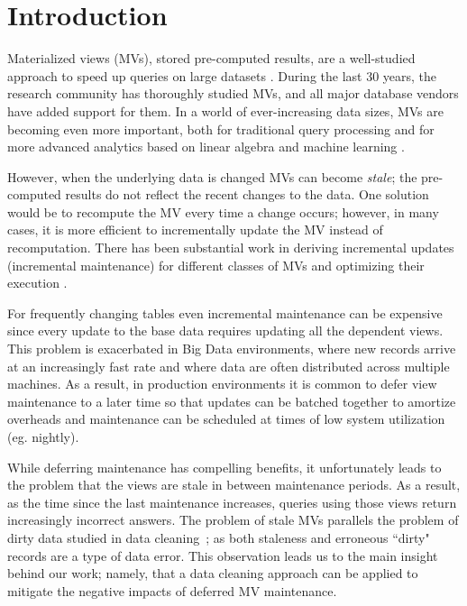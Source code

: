 \vspace{-0.5em}
\section{Introduction}
Materialized views (MVs), stored pre-computed results, are a well-studied approach to speed up queries on large datasets \cite{LarsonY85, gupta1995maintenance, chirkova2011materialized, halevy2001answering}.
During the last 30 years, the research community has thoroughly studied MVs, and all major database vendors have added support for them.
In a world of ever-increasing data sizes, MVs are becoming even more important, both for traditional query processing and for more advanced analytics based on linear algebra and machine learning \cite{nikolic2014linview, zhang2014mat}.

However, when the underlying data is changed MVs can become \emph{stale}; the pre-computed results do not reflect the recent changes to the data. 
One solution would be to recompute the MV every time a change occurs; however, in many cases, it is more efficient to incrementally update the MV instead of recomputation.
There has been substantial work in deriving incremental updates (incremental maintenance) for different classes of MVs and optimizing their execution \cite{chirkova2011materialized}.

For frequently changing tables even incremental maintenance can be expensive since every update to the base data requires updating all the dependent views.  
This problem is exacerbated in Big Data environments, where new records arrive at an increasingly fast rate and where data are often 
distributed across multiple machines.  
As a result, in production environments it is common to defer view maintenance to a later time \cite{chirkova2011materialized, zhou2007lazy, DBLP:conf/sigmod/ColbyGLMT96} so that updates can be batched together to amortize overheads and maintenance can be scheduled at times of low system utilization (eg. nightly).  

While deferring maintenance has compelling benefits, it unfortunately leads to the problem that the views are stale in between maintenance periods. 
As a result, as the time since the last maintenance increases, queries using those views return increasingly incorrect answers.
The problem of stale MVs parallels the problem of dirty data studied in data cleaning~\cite{rahm2000data}; as both staleness and erroneous ``dirty" records are a type of data error.
This observation leads us to the main insight behind our work; namely, that a data cleaning approach can be applied to mitigate the negative impacts of deferred MV maintenance.

